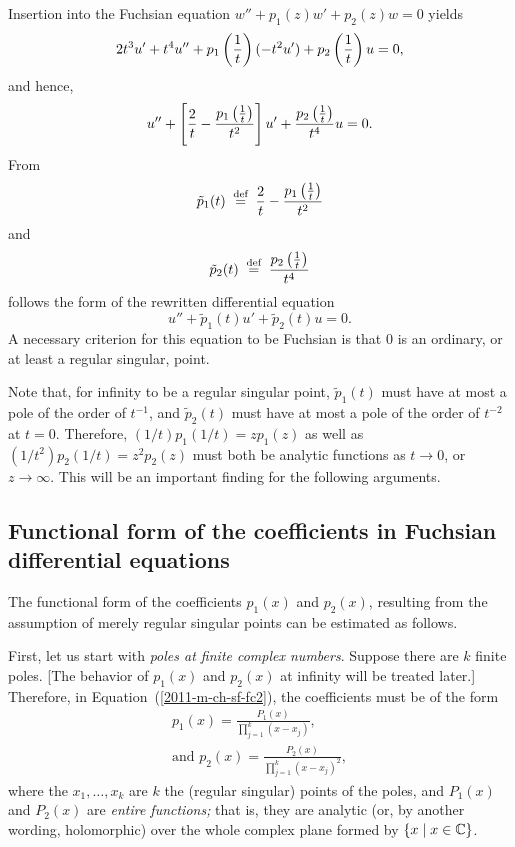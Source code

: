 Insertion into the Fuchsian equation $w''+p_1(z)w'+p_2(z)w=0 $ yields
\begin{equation}
   2t^3u'+t^4u''+p_1\left({1\over t}\right)(-t^2u')+
   p_2\left({1\over t}\right)u=0,
\end{equation}
and hence,
\begin{equation}
    u''+\left[{2\over t}-{p_1\left({1\over t}\right)
   \over t^2}\right]u'+{p_2\left({1\over t}\right)\over t^4}u=0.
\end{equation}
From
\begin{equation}
\tilde p_1(t)\stackrel{{\tiny \textrm{ def }}}{=} {2\over t}-
{p_1\left({1\over t}\right)\over t^2}
\label{2016-m-ch-sf-idp1}
\end{equation}
and
\begin{equation}
\displaystyle \tilde p_2(t)\stackrel{{\tiny \textrm{ def }}}{=} {p_2\left({1\over t}\right)\over t^4}
\label{2016-m-ch-sf-idp2}
\end{equation}
follows the form of the rewritten differential equation
\begin{equation}
u''+\tilde p_1(t)u'+\tilde p_2(t)u=0.
\end{equation}
A necessary criterion for this equation to be Fuchsian is that $0$ is an ordinary,
or at least a regular singular, point.

Note that, for infinity to be a regular singular point,
$\tilde p_1(t)$ must have at most a pole of the order of $ t^{-1}$,
and
$\tilde p_2(t)$ must have at most a pole of the order of $t^{-2}$
at $t=0$.
Therefore,
$(1/t) p_1(1/t) = z p_1(z)$
as well as
$(1/t^2) p_2(1/t) = z^2 p_2(z)$
must both be analytic functions as $t\rightarrow 0$,
or $z\rightarrow \infty$.
This will be an important finding for the following arguments.


\subsection{Functional form of the coefficients in Fuchsian differential equations}

The functional form of the coefficients $p_1(x)$ and $p_2(x)$,
resulting from the assumption of merely regular singular points can be estimated as follows.

First, let us start with {\em poles at finite complex numbers}.
Suppose there are $k$ finite poles.
[The behavior of
$p_1(x)$ and $p_2(x)$ at
infinity will be treated later.]
Therefore, in Equation~(\ref{2011-m-ch-sf-fc2}),
the coefficients must be of the form
\begin{equation}
\begin{split}
p_1  (x)  = \frac{P_1(x)}{\prod_{j=1}^k (x-x_j)} ,\\
\textrm{and }
p_2 (x) =  \frac{P_2(x)}{\prod_{j=1}^k (x-x_j)^2} ,
\end{split}
\label{2011-m-ch-sf-eforp}
\end{equation}
where the $x_1,\ldots ,x_k$ are $k$ the (regular singular) points of the poles,
and $P_1(x)$ and $P_2(x)$ are {\em entire functions;}
that is, they are analytic (or, by another wording, holomorphic)
over the whole complex plane formed by $\{x \mid x \in {\Bbb C} \}$.



